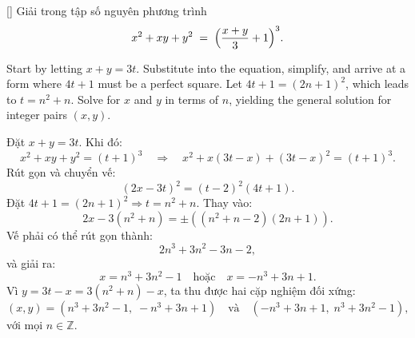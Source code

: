 \documentclass[../04-diophantine-equations.tex]{subfiles}
\begin{document}
\begin{example*}\label{example:USA-2015-MO-P1}[\textbf{}]
	Giải trong tập số nguyên phương trình  
	\[
		x^2 + xy + y^2 \;=\; \Bigl(\frac{x+y}{3} + 1\Bigr)^3.
	\]
\end{example*}

\begin{story*}
    Start by letting \(x + y = 3t\). Substitute into the equation, simplify, and arrive at a form where \(4t + 1\) must be a perfect square. Let \(4t + 1 = (2n + 1)^2\), which leads to \(t = n^2 + n\). Solve for \(x\) and \(y\) in terms of \(n\), yielding the general solution for integer pairs \( (x, y) \).
\end{story*}

\bigbreak

\begin{soln}\footnotemark
	Đặt \(x+y=3t\). Khi đó:
	\[
		x^2 + xy + y^2 = (t+1)^3
		\quad\Longrightarrow\quad
		x^2 + x(3t - x) + (3t - x)^2 = (t+1)^3.
	\]
	Rút gọn và chuyển vế:
	\[
		(2x - 3t)^2 = (t - 2)^2 (4t + 1).
	\]
	Đặt \( 4t + 1 = (2n + 1)^2 \Rightarrow t = n^2 + n \). Thay vào:
	\[
		2x - 3(n^2 + n) = \pm\left( (n^2 + n - 2)(2n + 1) \right).
	\]
	Vế phải có thể rút gọn thành:
	\[
		2n^3 + 3n^2 - 3n - 2,
	\]
	và giải ra:
	\[
		x = n^3 + 3n^2 - 1 \quad \text{hoặc} \quad x = -n^3 + 3n + 1.
	\]
	Vì \( y = 3t - x = 3(n^2 + n) - x \), ta thu được hai cặp nghiệm đối xứng:
	\[
		(x, y) = \left(n^3 + 3n^2 - 1,\; -n^3 + 3n + 1\right)
		\quad \text{và} \quad
		(-n^3 + 3n + 1,\; n^3 + 3n^2 - 1),
	\]
	với mọi \( n \in \mathbb{Z} \).
\end{soln}

\end{document}
